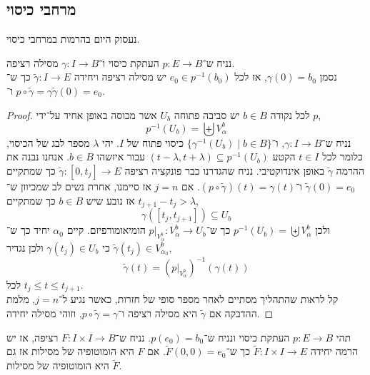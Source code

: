 \subsection{מרחבי כיסוי}
נעסוק היום בהרמות במרחבי כיסוי.
\begin{theorem}
	נניח ש־$p : E \to B$ העתקת כיסוי ו־$\gamma : I \to B$ מסילה רציפה. \\
	נסמן $\gamma(0) = b_0$, אז לכל $e_0 \in p^{-1}(b_0)$ יש מסילה רציפה ויחידה $\tilde{\gamma} : I \to E$ כך ש־$p \circ \tilde{\gamma} = \gamma$ ו־$\tilde{\gamma}(0) = e_0$.
\end{theorem}
\begin{proof}
	לכל נקודה $b \in B$ יש סביבה פתוחה $U_b$ אשר מכוסה באופן אחיד על־ידי $p$,
	\[
		p^{-1}(U_b)
		= \biguplus V_{\alpha}^b
	\]
	נניח ש־$\gamma : I \to B$, ו־$\{ \gamma^{-1}(U_b) \mid b \in B \}$ כיסוי פתוח של $I$.
	יהי $\lambda$ מספר לבג של הכיסוי, כלומר לכל $t \in I$ הקטע $(t - \lambda, t + \lambda) \subseteq p^{-1}(U_b)$ עבור איזשהו $b \in B$.
	אנחנו נבנה את ההרמה $\tilde{\gamma}$ באופן אינדוקטיבי.
	נניח שהגדרנו כבר פונקציה רציפה $\tilde{\gamma} : [0, t_j] \to E$ כך שמתקיים $\tilde{\gamma}(0) = e_0$ ו־$(p \circ \tilde{\gamma})(t) = \gamma(t)$.
	אם $j = n$ אז סיימנו, אחרת נשים לב שמכיוון ש־$t_{j + 1} - t_j > \lambda$ אז נובע שיש $b \in B$ כך שמתקיים,
	\[
		\gamma([t_j, t_{j + 1}]) \subseteq U_b
	\]
	ולכן $p^{-1}(U_b) = \biguplus V_{\alpha}^b$ כך ש־$p |_{V_{\alpha}^b} : V_{\alpha}^b \to U_b$ הומיאומורפיזם.
	קיים $\alpha_0$ יחיד כך ש־$\tilde{\gamma}(t_j) \in V_{\alpha_0}^b$ כי $\gamma(t_j) \in U_b$ ולכן נגדיר,
	\[
		\tilde{\gamma}(t)
		= {(p |_{V_{\alpha}^b})}^{-1}(\gamma(t))
	\]
	לכל $t_j \le t \le t_{j + 1}$. \\
	קל לראות שהתהליך מסתיים לאחר מספר סופי של חזרות, כאשר נגיע ל־$j = n$,
	מלמת ההדבקה אם $\tilde{\gamma}$ היא מסילה רציפה ו־$p \circ \tilde{\gamma} = \gamma$, וזוהי מסילה יחידה.
\end{proof}
\begin{theorem}
	תהי $p : E \to B$ העתקת כיסוי ונניח ש־$p(e_0) = b_0$.
	נניח ש־$F : I \times I \to B$ רציפה, אז יש הרמה יחידה $\tilde{F} : I \times I \to E$ כך ש־$\tilde{F}(0, 0) = e_0$.
	אם $F$ היא הומוטופיה של מסילות אז גם $\tilde{F}$ היא הומוטופיה של מסילות.
\end{theorem}

\listoftheorems[title=הגדרות ומשפטים,ignoreall,show={theorem,definition},swapnumber,onlynamed={proposition}]



